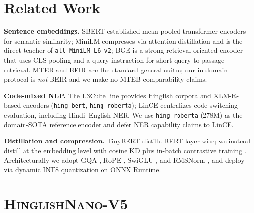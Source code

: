 \documentclass[11pt]{article}
\newcommand{\nano}{\textsc{HinglishNano}}
\begin{document}
\section{Related Work}
\textbf{Sentence embeddings.} SBERT \cite{reimers2019} established mean-pooled transformer encoders for semantic similarity; MiniLM \cite{wang2020} compresses via attention distillation and is the direct teacher of \texttt{all-MiniLM-L6-v2}; BGE \cite{xiao2023} is a strong retrieval-oriented encoder that uses CLS pooling and a query instruction for short-query-to-passage retrieval. MTEB \cite{muennighoff2023} and BEIR \cite{thakur2021} are the standard general suites; our in-domain protocol is \emph{not} BEIR and we make no MTEB comparability claims.

\textbf{Code-mixed NLP.} The L3Cube line \cite{nagireddy2023} provides Hinglish corpora and XLM-R-based encoders \cite{conneau2020} (\texttt{hing-bert}, \texttt{hing-roberta}); LinCE \cite{aguilar2020} centralizes code-switching evaluation, including Hindi--English NER. We use \texttt{hing-roberta} (278M) as the domain-SOTA reference encoder and defer NER capability claims to LinCE.

\textbf{Distillation and compression.} TinyBERT \cite{jiao2020} distills BERT layer-wise; we instead distill at the embedding level with cosine KD \cite{hinton2015} plus in-batch contrastive training \cite{henderson2017}. Architecturally we adopt GQA \cite{ainslie2023}, RoPE \cite{su2021}, SwiGLU \cite{shazeer2020}, and RMSNorm \cite{zhang2019}, and deploy via dynamic INT8 quantization \cite{jacob2018} on ONNX Runtime.

\section{\nano{}-V5}
\end{document}
